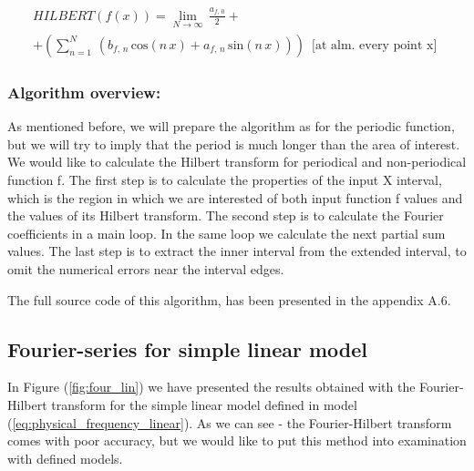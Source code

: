 \documentclass[12pt,twoside,a4paper]{article}
\numberwithin{equation}{subsection}
\numberwithin{figure}{subsection}
\begin{document}
\begin{multline} \label{eq:fourier_hilbert}
  HILBERT(f(x)) = \lim_{N\rightarrow \infty }\,\frac {{a_{f, \,0}}}{2} 
  + \\ + (\sum_{ n=1}^{N}\,({b_{f, \,n}}\,\mathrm{cos}(n\,x)
       + {a_{f, \,n}}\, \mathrm{sin}(n\,x)))
       \,\mbox{ [at alm. every point x] }
\end{multline}

\subsubsection*{Algorithm overview:}

As mentioned before, we will prepare the algorithm as for the periodic function, but we will try to imply that the period is much longer
than the area of interest. We would like to calculate the Hilbert transform for periodical and non-periodical function f. The first step is
to calculate the properties of the input X interval, which is the region in which we are interested of both input function f values and the
values of its Hilbert transform. The second step is to calculate the Fourier coefficients in a main loop. In the same loop we calculate the
next partial sum values. The last step is to extract the inner interval from the extended interval, to omit the numerical errors near the
interval edges.

The full source code of this algorithm, has been presented in the appendix A.6.

\subsection{Fourier-series for simple linear model} \label{chap:fourier_lin}

In Figure (\ref{fig:four_lin}) we have presented the results obtained with the Fourier-Hilbert transform for the simple
linear model defined in model (\ref{eq:physical_frequency_linear}). As we can see - the Fourier-Hilbert transform comes with poor accuracy,
but we would like to put this method into examination with defined models.
\end{document}
